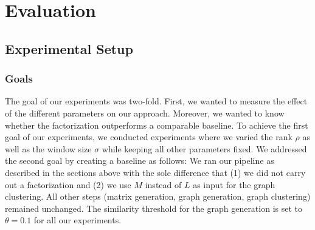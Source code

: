 \section{Evaluation}

\label{cha314:sec:evalval}

\subsection{Experimental Setup}

\subsubsection{Goals}
The goal of our experiments was two-fold. First, we wanted to measure the effect of the different parameters on our approach.
Moreover, we wanted to know whether the factorization outperforms a comparable baseline.
To achieve the first goal of our experiments, we conducted experiments where we varied the rank $\rho$ as well as the window size $\sigma$ while keeping all other parameters fixed.
We addressed the second goal by creating a baseline as follows: We ran our pipeline as described in the sections above with the sole difference that (1) we did not carry out a factorization and (2) we use $M$ instead of $L$ as input for the graph clustering. All other steps (matrix generation, graph generation, graph clustering) remained unchanged.
The similarity threshold for the graph generation is set to $\theta=0.1$ for all our experiments.

